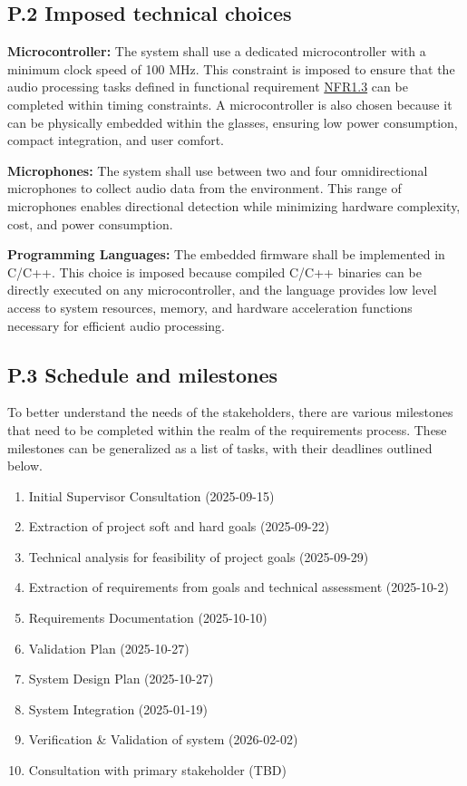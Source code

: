 \documentclass[12pt]{article}
\theoremstyle{definition}
\begin{document}
\subsection{P.2 Imposed technical choices}

\textbf{Microcontroller:}  
The system shall use a dedicated microcontroller with a minimum clock speed of
100 MHz. This constraint is imposed to ensure that the audio processing tasks
defined in functional requirement \hyperref[NFR1_3]{NFR1.3} can be completed
within timing constraints. A microcontroller is also chosen because it can be
physically embedded within the glasses, ensuring low power consumption, compact
integration, and user comfort.

\textbf{Microphones:}  
The system shall use between two and four omnidirectional microphones to collect
audio data from the environment. This range of microphones enables directional
detection while minimizing hardware complexity, cost, and power consumption.

\textbf{Programming Languages:}  
The embedded firmware shall be implemented in C/C++. This choice is imposed
because compiled C/C++ binaries can be directly executed on any microcontroller,
and the language provides low level access to system resources, memory, and
hardware acceleration functions necessary for efficient audio processing.

\subsection{P.3 Schedule and milestones} \label{item: p3}   

To better understand the needs of the stakeholders, there are various milestones
 that need to be completed within the realm of the requirements process. These
 milestones can be generalized as a list of tasks, with their deadlines outlined
 below.

\begin{enumerate}
  \item Initial Supervisor Consultation (2025-09-15) \label{item: p3-1}
  \item Extraction of project soft and hard goals (2025-09-22) 
  \label{item: p3-2}
  \item Technical analysis for feasibility of project goals (2025-09-29) 
  \label{item: p3-3}
  \item Extraction of requirements from goals and technical assessment
  (2025-10-2) \label{item: p3-4}
  \item Requirements Documentation (2025-10-10) \label{item: p3-5}
  \item Validation Plan (2025-10-27) \label{item: p3-6}
  \item System Design Plan (2025-10-27) \label{item: p3-7}
  \item System Integration (2025-01-19) \label{item: p3-8}
  \item Verification \& Validation of system (2026-02-02) \label{item: p3-9}
  \item Consultation with primary stakeholder (TBD) \label{item: p3-10}
\end{enumerate}
\end{document}
